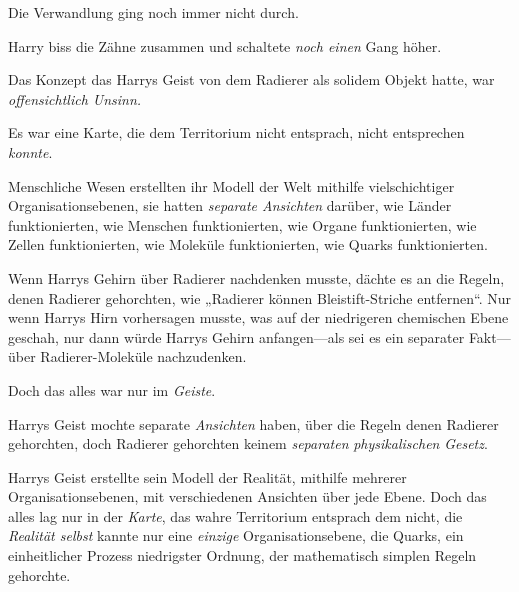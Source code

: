 Die Verwandlung ging noch immer nicht durch.

Harry biss die Zähne zusammen und schaltete \emph{noch einen} Gang höher.

Das Konzept das Harrys Geist von dem Radierer als solidem Objekt hatte, war \emph{offensichtlich Unsinn.}

Es war eine Karte, die dem Territorium nicht entsprach, nicht entsprechen \emph{konnte}.

Menschliche Wesen erstellten ihr Modell der Welt mithilfe vielschichtiger Organisationsebenen, sie hatten \emph{separate Ansichten} darüber, wie Länder funktionierten, wie Menschen funktionierten, wie Organe funktionierten, wie Zellen funktionierten, wie Moleküle funktionierten, wie Quarks funktionierten.

Wenn Harrys Gehirn über Radierer nachdenken musste, dächte es an die Regeln, denen Radierer gehorchten, wie „Radierer können Bleistift-Striche entfernen“. Nur wenn Harrys Hirn vorhersagen musste, was auf der niedrigeren chemischen Ebene geschah, nur dann würde Harrys Gehirn anfangen—als sei es ein separater Fakt—über Radierer-Moleküle nachzudenken.

Doch das alles war nur im \emph{Geiste}.

Harrys Geist mochte separate \emph{Ansichten} haben, über die Regeln denen Radierer gehorchten, doch Radierer gehorchten keinem \emph{separaten} \emph{physikalischen} \emph{Gesetz}.

Harrys Geist erstellte sein Modell der Realität, mithilfe mehrerer Organisationsebenen, mit verschiedenen Ansichten über jede Ebene. Doch das alles lag nur in der \emph{Karte}, das wahre Territorium entsprach dem nicht, die \emph{Realität selbst} kannte nur eine \emph{einzige} Organisationsebene, die Quarks, ein einheitlicher Prozess niedrigster Ordnung, der mathematisch simplen Regeln gehorchte.

